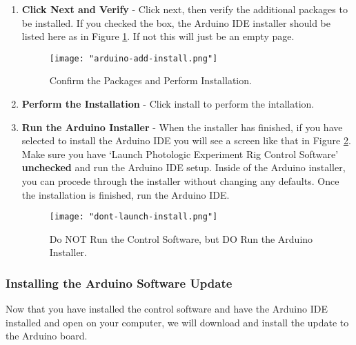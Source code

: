 \documentclass{article}
\begin{document}
\begin{enumerate}
    \item \textbf{Click Next and Verify} - Click next, then verify the additional packages to be installed. If you checked the box, the Arduino IDE installer should be listed here
        as in Figure \ref{fig:confirm-install}. If not
        this will just be an empty page.

        \begin{figure}[h!]
            \centering
            \texttt{[image: "arduino-add-install.png"]}
            \caption{Confirm the Packages and Perform Installation.}
            \label{fig:confirm-install}
        \end{figure}
        \FloatBarrier

    \item \textbf{Perform the Installation} - Click install to perform the intallation.

    \item \textbf{Run the Arduino Installer} - When the installer has finished, if you have selected to install the Arduino IDE you will see a screen like that in Figure \ref{fig:ard-install}.
        Make sure you have `Launch Photologic Experiment Rig Control Software' \textbf{unchecked} and run the Arduino IDE setup. Inside of the Arduino installer, you can procede 
        through the installer without changing any defaults. Once the installation is finished, run the Arduino IDE.

        \begin{figure}[h!]
            \centering
            \texttt{[image: "dont-launch-install.png"]}
            \caption{Do NOT Run the Control Software, but DO Run the Arduino Installer.}
            \label{fig:ard-install}
        \end{figure}
        \FloatBarrier

\end{enumerate}

\subsubsection{Installing the Arduino Software Update}
\label{sec:arduino-soft}
Now that you have installed the control software and have the Arduino IDE installed and open on your computer, we will download and install the update to the Arduino board.
\end{document}

